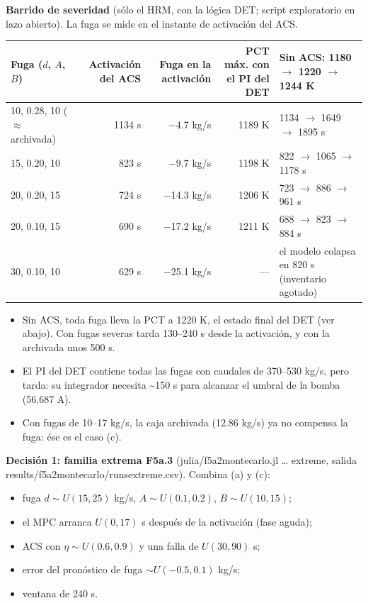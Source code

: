 \documentclass[11pt,a4paper]{article}
\newcommand{\codeus}{\textunderscore\allowbreak}
\newcommand{\code}[1]{{\small\ttfamily\let\_\codeus #1}}
\begin{document}
\textbf{Barrido de severidad} (sólo el HRM, con la lógica DET; script exploratorio en lazo abierto). La fuga se mide en el instante de activación del ACS.

{\footnotesize
\begin{xltabular}{\linewidth}{@{}YRRRY@{}}
\toprule
\textbf{Fuga ($d$, $A$, $B$)} & \textbf{Activación del ACS} & \textbf{Fuga en la activación} & \textbf{PCT máx. con el PI del DET} & \textbf{Sin ACS: 1180 $\to$ 1220 $\to$ 1244 K} \\
\midrule
{}, 0.28, 10 ($\approx$ archivada) & 1134 s & $-$4.7 kg/s & 1189 K & 1134 $\to$ 1649 $\to$ 1895 s \\
15, 0.20, 10 & 823 s & $-$9.7 kg/s & 1198 K & 822 $\to$ 1065 $\to$ 1178 s \\
20, 0.20, 15 & 724 s & $-$14.3 kg/s & 1206 K & 723 $\to$ 886 $\to$ 961 s \\
20, 0.10, 15 & 690 s & $-$17.2 kg/s & 1211 K & 688 $\to$ 823 $\to$ 884 s \\
30, 0.10, 10 & 629 s & $-$25.1 kg/s & — & el modelo colapsa en 820 s (inventario agotado) \\
\bottomrule
\end{xltabular}}

\begin{itemize}
\item Sin ACS, toda fuga lleva la PCT a 1220 K, el estado final del DET (ver abajo). Con fugas severas tarda 130–240 s desde la activación, y con la archivada unos 500 s.
\item El PI del DET contiene todas las fugas con caudales de 370–530 kg/s, pero tarda: su integrador necesita \textasciitilde{}150 s para alcanzar el umbral de la bomba (56.687 A).
\item Con fugas de 10–17 kg/s, la caja archivada (12.86 kg/s) ya no compensa la fuga: ése es el caso (c).
\end{itemize}

\textbf{Decisión 1: familia extrema F5a.3} (\code{julia/f5a2\_monte\_carlo.jl … extreme}, salida \code{results/f5a2\_monte\_carlo/runs\_extreme.csv}). Combina (a) y (c):

\begin{itemize}
\item fuga $d\sim U(15,25)$ kg/s, $A\sim U(0.1,0.2)$, $B\sim U(10,15)$;
\item el MPC arranca $U(0,17)$ s después de la activación (fase aguda);
\item ACS con $\eta\sim U(0.6,0.9)$ y una falla de $U(30,90)$ s;
\item error del pronóstico de fuga $\sim U(-0.5,0.1)$ kg/s;
\item ventana de 240 s.
\end{itemize}
\end{document}

